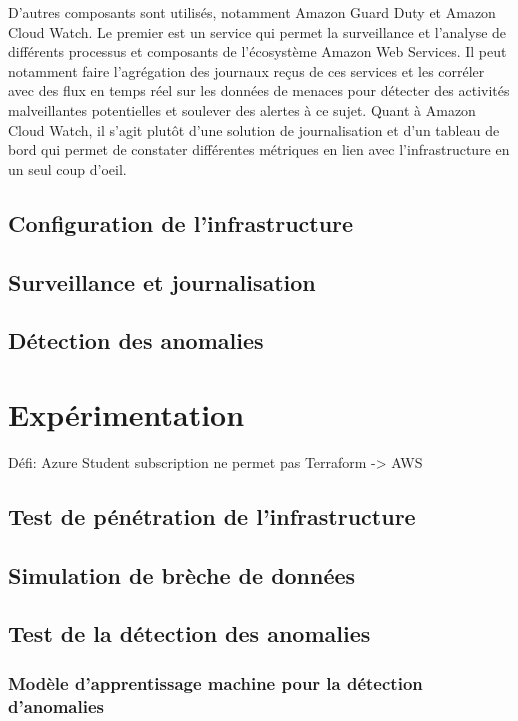 \documentclass[conference]{IEEEtran}
\begin{document}
D’autres composants sont utilisés, notamment Amazon Guard Duty et Amazon Cloud Watch. Le premier est un service qui permet la surveillance et l’analyse de différents processus et composants de l’écosystème Amazon Web Services. Il peut notamment faire l’agrégation des journaux reçus de ces services et les corréler avec des flux en temps réel sur les données de menaces pour détecter des activités malveillantes potentielles et soulever des alertes à ce sujet. Quant à Amazon Cloud Watch, il s’agit plutôt d’une solution de journalisation et d’un tableau de bord qui permet de constater différentes métriques en lien avec l’infrastructure en un seul coup d’oeil.
\subsection{Configuration de l'infrastructure}

\subsection{Surveillance et journalisation}

\subsection{Détection des anomalies}

\section{Expérimentation}

Défi: Azure Student subscription ne permet pas Terraform -> AWS

\subsection{Test de pénétration de l'infrastructure}

\subsection{Simulation de brèche de données}

\subsection{Test de la détection des anomalies}
\subsubsection{Modèle d'apprentissage machine pour la détection d'anomalies}
\end{document}

